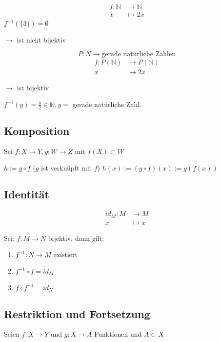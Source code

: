 \documentclass[fleqn]{scrbook}
\newcommand{\N}{\mathbb{N}}
\newenvironment{example}{{\bfseries Beispiel }}{}
\begin{document}
\begin{example}
\begin{align*}
  f : \N & \to     \N\\
                    x & \mapsto 2x
\end{align*}
$ f^{-1}(\{3\}) = \emptyset $

$\rightarrow$ ist nicht bijektiv

\[P : N \to \text{gerade natürliche Zahlen}\]
\begin{align*}
  f : P(\N) & \to     P(\N)\\
                       x & \mapsto 2x
\end{align*}
\end{example}

$\rightarrow$ ist bijektiv

$f^{-1}(y)=\frac{y}{2} \in \N,y=$ gerade natürliche Zahl.

\subsection{Komposition}

Sei $f : X \to Y, g : W \to Z$ mit $f(X) \subset W$

$h:= g \circ f$ ($g$ ist verknüpft mit $f$)
$h(x):= (g \circ f)(x):=g(f(x))$

\subsection{Identität}

\begin{align*}
  id_M : M & \to     M\\
              x & \mapsto x
\end{align*}

Sei: $f : M \to N$ bijektiv, dann gilt:

\begin{enumerate}
 \item $f^{-1} : N \to M \text{ existiert} $
 \item $f^{-1} \circ f = id_M$
 \item $f \circ f^{-1} = id_N$
\end{enumerate}

\subsection{Restriktion und Fortsetzung}

Seien $f : X \to Y$ und $g : X \to A$ Funktionen und $A \subset X$
\end{document}
